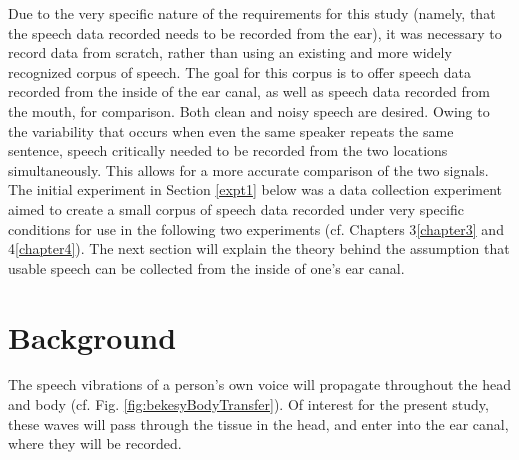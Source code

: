 \documentclass[dissertation,copyright]{uathesis}
\begin{document}
Due to the very specific nature of the requirements for this study (namely, that the speech data recorded needs to be recorded from the ear), it was necessary to record data from scratch, rather than using an existing and more widely recognized corpus of speech.  The goal for this corpus is to offer speech data recorded from the inside of the ear canal, as well as speech data recorded from the mouth, for comparison.  Both clean and noisy speech are desired.
Owing to the variability that occurs when even the same speaker repeats the same sentence, speech critically needed to be recorded from the two locations simultaneously.  This allows for a more accurate comparison of the two signals.
The initial experiment in Section \ref{expt1} below was a data collection experiment aimed to create a small corpus of speech data recorded under very specific conditions for use in the following two experiments (cf. Chapters 3\ref{chapter3} and 4\ref{chapter4}).  The next section will explain the theory behind the assumption that usable speech can be collected from the inside of one's ear canal.

\section{Background}

The speech vibrations of a person's own voice will propagate throughout the head and body (cf. Fig. \ref{fig:bekesyBodyTransfer}).  Of interest for the present study, these waves will pass through the tissue in the head, and enter into the ear canal, where they will be recorded.
\end{document}
